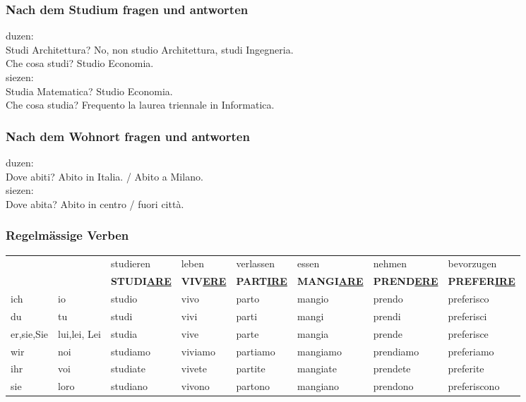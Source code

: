 \documentclass[10pt]{scrartcl}
\begin{document}
\begin{multicols*}{2}
\subsubsection*{Nach dem Studium fragen und antworten}
duzen:\\
Studi Architettura? \bigskip No, non studio Architettura, studi Ingegneria.\\
Che cosa studi? \bigskip Studio Economia.\\
siezen:\\
Studia Matematica? \bigskip Studio Economia.\\
Che cosa studia? \bigskip Frequento la laurea triennale in Informatica.
\subsubsection*{Nach dem Wohnort fragen und antworten}
duzen:\\
Dove abiti? \bigskip Abito in Italia. / Abito a Milano.\\
siezen:\\
Dove abita? \bigskip Abito in centro / fuori città.
\end{multicols*}
\subsubsection*{Regelmässige Verben}
\begin{tabular}{llllllll}
&& studieren & leben & verlassen & essen & nehmen & bevorzugen\\
&& \textbf{STUDI\underline{ARE}} & \textbf{VIV\underline{ERE}} & \textbf{PART\underline{IRE}} & \textbf{MANGI\underline{ARE}} & \textbf{PREND\underline{ERE}} & \textbf{PREFER\underline{IRE}}  \\
ich & io & studio & vivo & parto & mangio & prendo & preferisco \\
du & tu & studi & vivi & parti & mangi & prendi & preferisci\\
er,sie,Sie & lui,lei, Lei & studia & vive & parte & mangia & prende & preferisce \\
wir & noi & studiamo & viviamo & partiamo & mangiamo & prendiamo & preferiamo\\
ihr & voi & studiate & vivete & partite & mangiate & prendete & preferite \\
sie & loro & studiano & vivono & partono & mangiano & prendono & preferiscono\\
\end{tabular}
\end{document}
